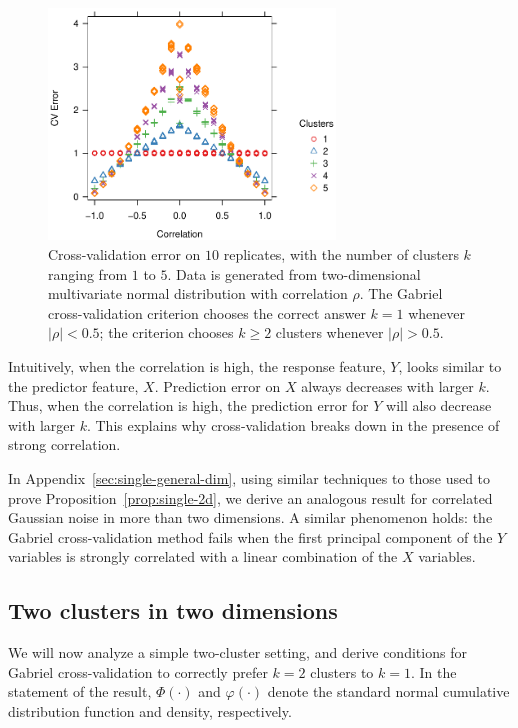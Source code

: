 \documentclass[12pt]{article}
\begin{document}
\begin{figure}
\centering
\includegraphics[width=3in]{demo/nullcorr/equal.pdf}
\caption{Cross-validation error on $10$ replicates, with the number of
clusters $k$ ranging from $1$ to $5$.  Data is generated from two-dimensional
multivariate normal distribution with correlation $\rho$.  The Gabriel
cross-validation criterion chooses the correct answer $k = 1$ whenever
$|\rho| < 0.5$; the criterion chooses $k \geq 2$ clusters whenever $|\rho| > 0.5$.}
\label{fig:nullcorr-equal}
\end{figure}


Intuitively, when the correlation is high, the response feature, $Y$, looks
similar to the predictor feature, $X$. Prediction error on $X$ always
decreases with larger $k$. Thus, when the correlation is high, the prediction
error for $Y$ will also decrease with larger $k$. This explains why
cross-validation breaks down in the presence of strong correlation.


In Appendix~\ref{sec:single-general-dim}, using similar techniques to those used
to prove Proposition~\ref{prop:single-2d}, we derive an analogous result for correlated
Gaussian noise in more than two dimensions. A similar phenomenon holds:
the Gabriel cross-validation method fails when the first principal component
of the $Y$ variables is strongly correlated with a linear combination of the
$X$ variables.


\subsection{Two clusters in two dimensions}


We will now analyze a simple two-cluster setting, and derive conditions for
Gabriel cross-validation to correctly prefer $k=2$ clusters to $k=1$. In the
statement of the result, $\Phi(\cdot)$ and $\varphi(\cdot)$ denote the
standard normal cumulative distribution function and density, respectively.  
\end{document}
